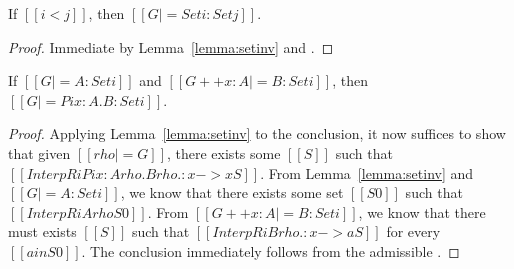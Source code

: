 \documentclass[acmsmall,screen=true,
\ifpublic review=false\else,review=true\fi
  ,anonymous=\ifanonymous true\else false\fi]{acmart}
\newcommand{\scw}[1]{}
\begin{document}



\begin{lemma}[ST-Set]
  \label{lemma:stset}
  If $[[i < j]]$, then $[[G |= Set i : Set j]]$.
\end{lemma}
\begin{proof}
  Immediate by Lemma~\ref{lemma:setinv} and .
\end{proof}

\begin{lemma}[ST-Pi]
  \label{lemma:stpi}
  If $[[G |= A : Set i]]$ and $[[G ++ x  : A |= B : Set i]]$, then $[[G |= Pi
  x : A . B : Set i]]$.
\end{lemma}
\begin{proof}
  Applying Lemma~\ref{lemma:setinv} to the
  conclusion, it now suffices to show that given $[[rho |= G]]$, there
  exists some $[[S]]$ such that $[[InterpR i Pi x : A{rho} . B{rho .:
    x -> x} S]]$.
  From Lemma~\ref{lemma:setinv} and $[[G |= A : Set i]]$, we know that
  there exists some set $[[S0]]$ such that $[[InterpR i A {rho} S0]]$.
From $[[G ++ x : A |= B : Set i]]$, we know that there must
exists $[[S]]$ such that $[[InterpR i B {rho .: x -> a} S]]$ for every $[[a
in S0]]$. The conclusion immediately follows from the admissible .
\end{proof}
\end{document}
